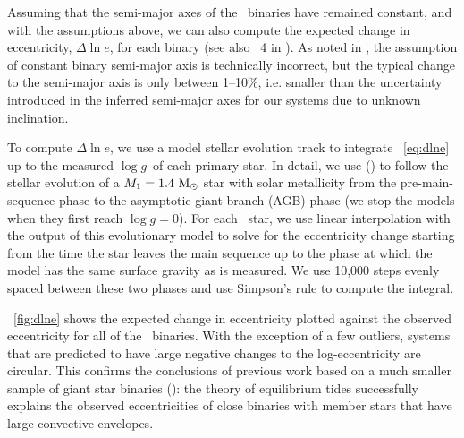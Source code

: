 \documentclass[modern, letterpaper]{aastex62}
\newcommand{\apogee}{\project{\acronym{APOGEE}}}
\newcommand{\logg}{\ensuremath{\log g}}
\begin{document}
Assuming that the semi-major axes of the \apogee\ binaries have remained
constant, and with the assumptions above, we can also compute the expected
change in eccentricity, $\Delta \ln e$, for each binary (see also \figurename~4
in \citealt{Verbunt:1995}).
As noted in \citet{Verbunt:1995}, the assumption of constant binary semi-major
axis is technically incorrect, but the typical change to the semi-major axis is
only between 1--10\%, i.e. smaller than the uncertainty introduced in the
inferred semi-major axes for our systems due to unknown inclination.

To compute $\Delta \ln e$, we use a model stellar evolution track to integrate
\eqname~\ref{eq:dlne} up to the measured \logg\ of each primary star.
In detail, we use  (\citealt{Paxton:2011}) to follow the stellar
evolution of a $M_1 = 1.4~\mathrm{M}_\odot$ star with solar metallicity from the
pre-main-sequence phase to the asymptotic giant branch (AGB) phase (we stop the
models when they first reach $\logg = 0$).
For each \apogee\ star, we use linear interpolation with the output of this
evolutionary model to solve for the eccentricity change starting from the time
the star leaves the main sequence up to the phase at which the model has the
same surface gravity as is measured.
We use 10,000 steps evenly spaced between these two phases and use Simpson's
rule to compute the integral.

\figurename~\ref{fig:dlne} shows the expected change in eccentricity plotted
against the observed eccentricity for all of the \apogee\ binaries.
With the exception of a few outliers, systems that are predicted to have large
negative changes to the log-eccentricity are circular.
This confirms the conclusions of previous work based on a much smaller sample of
giant star binaries (\citealt{Verbunt:1995}): the theory of equilibrium tides
successfully explains the observed eccentricities of close binaries with
member stars that have large convective envelopes.
\end{document}
